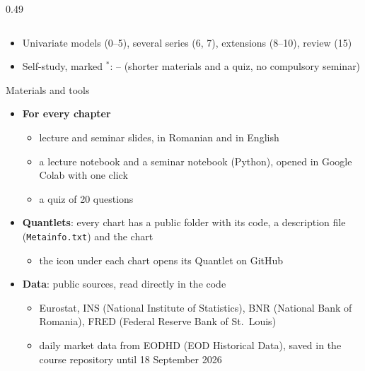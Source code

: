 \begin{frame}
\begin{columns}[T]
\begin{column}{0.49\textwidth}
\end{column}
\end{columns}
\begin{itemize}
    \item Univariate models (0--5), several series (6, 7), extensions (8--10), review (15)
    \item Self-study, marked $^*$: -- (shorter materials and a quiz, no compulsory seminar)
\end{itemize}
\end{frame}

\begin{frame}{Materials and tools}
\itemsize{\small}
\begin{itemize}
    \item \textbf{For every chapter}
    \begin{itemize}
        \item lecture and seminar slides, in Romanian and in English
        \item a lecture notebook and a seminar notebook (Python), opened in Google Colab with one click
        \item a quiz of 20 questions
    \end{itemize}
    \item \textbf{Quantlets}: every chart has a public folder with its code, a description file (\texttt{Metainfo.txt}) and the chart
    \begin{itemize}
        \item the icon under each chart opens its Quantlet on GitHub
    \end{itemize}
    \item \textbf{Data}: public sources, read directly in the code
    \begin{itemize}
        \item Eurostat, INS (National Institute of Statistics), BNR (National Bank of Romania), FRED (Federal Reserve Bank of St.\ Louis)
        \item daily market data from EODHD (EOD Historical Data), saved in the course repository until 18 September 2026
    \end{itemize}
\end{itemize}
\end{frame}

